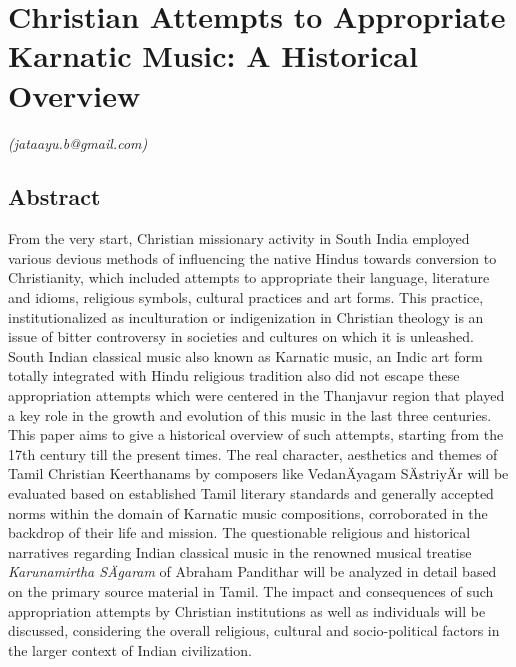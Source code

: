 
\chapter{Christian Attempts to Appropriate Karnatic Music: A Historical Overview}\label{chapter5}


\vspace{-.3cm}


\begin{flushright}
\textit{(jataayu.b@gmail.com)}
\end{flushright}


\section*{Abstract}

From the very start, Christian missionary activity in South India employed various devious methods of influencing the native Hindus towards conversion to Christianity, which included attempts to appropriate their language, literature and idioms, religious symbols, cultural practices and art forms. This practice, institutionalized as inculturation or indigenization in Christian theology is an issue of bitter controversy in societies and cultures on which it is unleashed. South Indian classical music also known as Karnatic music, an Indic art form totally integrated with Hindu religious tradition also did not escape these appropriation attempts which were centered in the Thanjavur region that played a key role in the growth and evolution of this music in the last three centuries. This paper aims to give a historical overview of such attempts, starting from the 17th century till the present times. The real character, aesthetics and themes of Tamil Christian Keerthanams by composers like VedanÄyagam SÄstriyÄr will be evaluated based on established Tamil literary standards and generally accepted norms within the domain of Karnatic music compositions, corroborated in the backdrop of their life and mission. The questionable religious and historical narratives regarding Indian classical music in the renowned musical treatise \textit{Karunamirtha SÄgaram} of Abraham Pandithar will be analyzed in detail based on the primary source material in Tamil. The impact and consequences of such appropriation attempts by Christian institutions as well as individuals will be discussed, considering the overall religious, cultural and socio-political factors in the larger context of Indian civilization.

